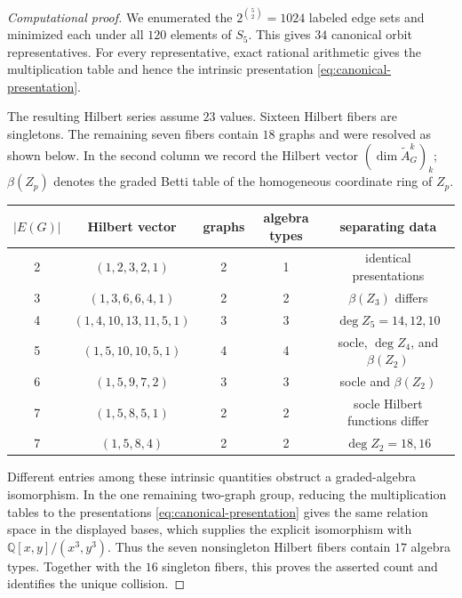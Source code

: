 \documentclass[11pt]{amsart}
\theoremstyle{plain}
\theoremstyle{definition}
\theoremstyle{remark}
\newcommand{\Q}{\mathbb{Q}}
\begin{document}
\begin{proof}[Computational proof]
We enumerated the $2^{\binom{5}{2}}=1024$ labeled edge sets and minimized each
under all $120$ elements of $S_5$.  This gives $34$ canonical orbit
representatives.  For every representative, exact rational arithmetic gives
the multiplication table and hence the intrinsic presentation
\eqref{eq:canonical-presentation}.

The resulting Hilbert series assume $23$ values.  Sixteen Hilbert fibers are
singletons.  The remaining seven fibers contain $18$ graphs and were resolved
as shown below.  In the second column we record the Hilbert vector
\((\dim \widetilde A_G^k)_k\); \(\beta(Z_p)\) denotes the graded Betti table of
the homogeneous coordinate ring of \(Z_p\).
\begin{center}
\scriptsize
\begin{tabular}{ccccc}
\hline
\(|E(G)|\) & Hilbert vector & graphs & algebra types & separating data\\
\hline
2 & $(1,2,3,2,1)$ & 2 & 1 & identical presentations\\
3 & $(1,3,6,6,4,1)$ & 2 & 2 & $\beta(Z_3)$ differs\\
4 & $(1,4,10,13,11,5,1)$ & 3 & 3 & $\deg Z_5=14,12,10$\\
5 & $(1,5,10,10,5,1)$ & 4 & 4 & socle, $\deg Z_4$, and $\beta(Z_2)$\\
6 & $(1,5,9,7,2)$ & 3 & 3 & socle and $\beta(Z_2)$\\
7 & $(1,5,8,5,1)$ & 2 & 2 & socle Hilbert functions differ\\
7 & $(1,5,8,4)$ & 2 & 2 & $\deg Z_2=18,16$\\
\hline
\end{tabular}
\end{center}
Different entries among these intrinsic quantities obstruct a graded-algebra
isomorphism.  In the one remaining two-graph group, reducing the multiplication
tables to the presentations \eqref{eq:canonical-presentation} gives the same
relation space in the displayed bases, which supplies the explicit
isomorphism with \(\Q[x,y]/(x^3,y^3)\).  Thus the seven nonsingleton Hilbert
fibers contain $17$ algebra types.  Together with the $16$ singleton fibers,
this proves the asserted count and identifies the unique collision.
\end{proof}
\end{document}
